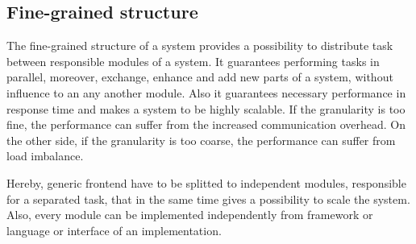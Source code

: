 \subsection {Fine-grained structure}
The fine-grained structure of a system provides a possibility to distribute task between responsible modules of a system. It guarantees performing tasks in parallel, moreover, exchange, enhance and add new parts of a system, without influence to an any another module. Also it guarantees necessary performance in response time and makes a system to be highly scalable. If the granularity is too fine, the performance can suffer from the increased communication overhead. On the other side, if the granularity is too coarse, the performance can suffer from load imbalance.

Hereby, generic frontend have to be splitted to independent modules, responsible for a separated task, that in the same time gives a possibility to scale the system. Also, every module can be implemented independently from framework or language or interface of an implementation. 

